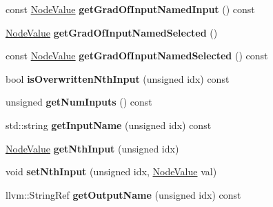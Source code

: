 \begin{DoxyCompactItemize}
const \hyperlink{structglow_1_1_node_value}{Node\+Value} {\bfseries get\+Grad\+Of\+Input\+Named\+Input} () const
\item 
\mbox{\label{classglow_1_1_soft_max_grad_node_a6c9c95fd4d61f5812a26d63588680935}} 
\hyperlink{structglow_1_1_node_value}{Node\+Value} {\bfseries get\+Grad\+Of\+Input\+Named\+Selected} ()
\item 
\mbox{\label{classglow_1_1_soft_max_grad_node_a4e87873569129558437012c9909ccc29}} 
const \hyperlink{structglow_1_1_node_value}{Node\+Value} {\bfseries get\+Grad\+Of\+Input\+Named\+Selected} () const
\item 
\mbox{\label{classglow_1_1_soft_max_grad_node_a024b3556b5a37e212527b496ec4b73c0}} 
bool {\bfseries is\+Overwritten\+Nth\+Input} (unsigned idx) const
\item 
\mbox{\label{classglow_1_1_soft_max_grad_node_a5fd87ae95788b07316cef7e6da31b40a}} 
unsigned {\bfseries get\+Num\+Inputs} () const
\item 
\mbox{\label{classglow_1_1_soft_max_grad_node_a2c01316dc88d7e1c4b986e2a532cbd13}} 
std\+::string {\bfseries get\+Input\+Name} (unsigned idx) const
\item 
\mbox{\label{classglow_1_1_soft_max_grad_node_aec2e970fed95b755cbbc48379a102c40}} 
\hyperlink{structglow_1_1_node_value}{Node\+Value} {\bfseries get\+Nth\+Input} (unsigned idx)
\item 
\mbox{\label{classglow_1_1_soft_max_grad_node_a29f857a1f32a6d3202d502d24ca9cd0a}} 
void {\bfseries set\+Nth\+Input} (unsigned idx, \hyperlink{structglow_1_1_node_value}{Node\+Value} val)
\item 
\mbox{\label{classglow_1_1_soft_max_grad_node_af6d2d1bba31349c268cb66d20681a6ff}} 
llvm\+::\+String\+Ref {\bfseries get\+Output\+Name} (unsigned idx) const
\item 
\mbox{\label{classglow_1_1_soft_max_grad_node_a9a92f281c808fc780b23bc09df83a8c0}} 

\end{DoxyCompactItemize}

